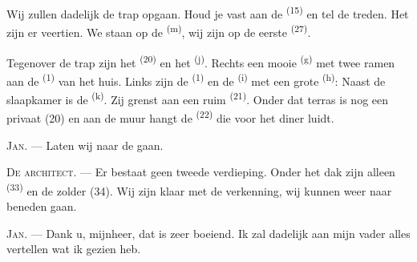 Wij zullen dadelijk de trap opgaan. Houd je vast aan de 
\textsuperscript{(15)} en tel de treden. Het zijn er veertien. We staan op de
 \textsuperscript{(m)}, wij zijn op de eerste
 \textsuperscript{(27)}.

\VUsaut{3.0mm}
\VUsaut{3.0mm}

Tegenover de trap zijn het  \textsuperscript{(20)} en het
 \textsuperscript{(j)}. Rechts een mooie
 \textsuperscript{(g)} met twee ramen aan de 
\textsuperscript{(1)} van het huis. Links zijn de  \textsuperscript{(1)} en
de  \textsuperscript{(i)} met een grote 
\textsuperscript{(h)}: Naast de slaapkamer is de
 \textsuperscript{(k)}. Zij grenst aan een ruim
 \textsuperscript{(21)}. Onder dat terras is nog een privaat (20)
en aan de muur hangt de  \textsuperscript{(22)} die voor het diner luidt.

\textsc{Jan}. --- Laten wij naar de  gaan.

\textsc{De architect}. --- Er bestaat geen tweede verdieping. Onder het dak zijn alleen
 \textsuperscript{(33)} en de zolder (34). Wij zijn klaar met de
verkenning, wij kunnen weer naar beneden gaan.

\textsc{Jan}. --- Dank u, mijnheer, dat is zeer boeiend. Ik zal dadelijk aan mijn vader alles
vertellen wat ik gezien heb.
\VUsaut{4.0mm}
\VUfilet{22mm}
